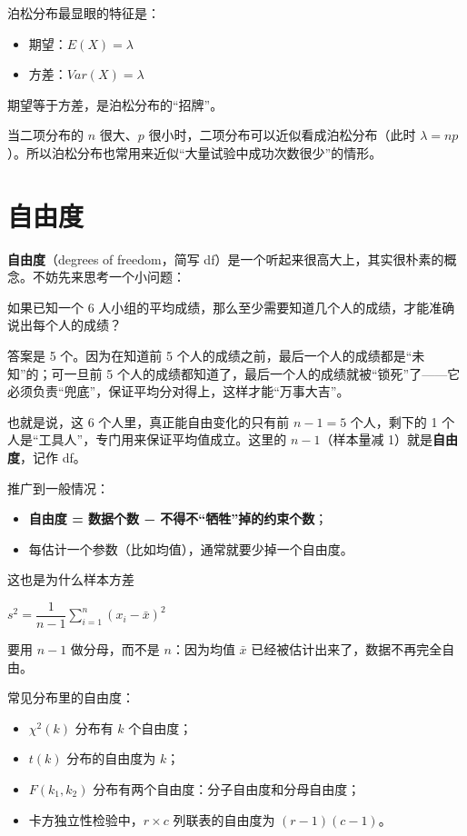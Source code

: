 \documentclass[lang=cn,10pt]{elegantbook}
\begin{document}
泊松分布最显眼的特征是：
\begin{itemize}
  \item 期望：$E(X)=\lambda$
  \item 方差：$Var(X)=\lambda$
\end{itemize}
期望等于方差，是泊松分布的“招牌”。

\begin{remark}
当二项分布的 $n$ 很大、$p$ 很小时，二项分布可以近似看成泊松分布（此时 $\lambda=np$）。所以泊松分布也常用来近似“大量试验中成功次数很少”的情形。
\end{remark}



\section{自由度}
\textbf{自由度}（degrees of freedom，简写 df）是一个听起来很高大上，其实很朴素的概念。不妨先来思考一个小问题：

如果已知一个 6 人小组的平均成绩，那么至少需要知道几个人的成绩，才能准确说出每个人的成绩？

答案是 5 个。因为在知道前 5 个人的成绩之前，最后一个人的成绩都是“未知”的；可一旦前 5 个人的成绩都知道了，最后一个人的成绩就被“锁死”了——它必须负责“兜底”，保证平均分对得上，这样才能“万事大吉”。

也就是说，这 6 个人里，真正能自由变化的只有前 $n-1=5$ 个人，剩下的 1 个人是“工具人”，专门用来保证平均值成立。这里的 $n-1$（样本量减 1）就是\textbf{自由度}，记作 df。

推广到一般情况：
\begin{itemize}
  \item \textbf{自由度 = 数据个数 − 不得不“牺牲”掉的约束个数}；
  \item 每估计一个参数（比如均值），通常就要少掉一个自由度。
\end{itemize}

这也是为什么样本方差
\begin{center}
$s^2=\dfrac{1}{n-1}\sum_{i=1}^{n}(x_i-\bar{x})^2$
\end{center}
要用 $n-1$ 做分母，而不是 $n$：因为均值 $\bar{x}$ 已经被估计出来了，数据不再完全自由。

常见分布里的自由度：
\begin{itemize}
  \item $\chi^2(k)$ 分布有 $k$ 个自由度；
  \item $t(k)$ 分布的自由度为 $k$；
  \item $F(k_1,k_2)$ 分布有两个自由度：分子自由度和分母自由度；
  \item 卡方独立性检验中，$r\times c$ 列联表的自由度为 $(r-1)(c-1)$。
\end{itemize}
\end{document}
